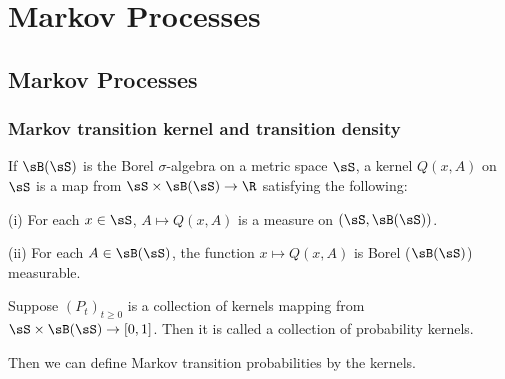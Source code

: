 \chapter{Markov Processes}

\section{Markov Processes}

\subsection{Markov transition kernel and transition density}

\begin{definition}\label{def:kernel_markov_process}
If $\sB(\sS)$ is the Borel $\sigma$-algebra on a metric space $\sS$, a kernel $Q(x,A)$ on $\sS$ is a map from $\sS\times \sB(\sS)\to \R$ satisfying the following:
\ben
\item [(i)] For each $x\in \sS$, $A\mapsto Q(x,A)$ is a measure on $(\sS,\sB(\sS))$.
\item [(ii)] For each $A\in \sB(\sS)$, the function $x\mapsto Q(x,A)$ is Borel ($\sB(\sS)$) measurable.
\een
\end{definition}

\begin{definition}
Suppose $(P_t)_{t\geq 0}$ is a collection of kernels mapping from $\sS\times\sB(\sS)\to [0,1]$. Then it is called a collection of probability kernels.
\end{definition}

Then we can define Markov transition probabilities by the kernels.


